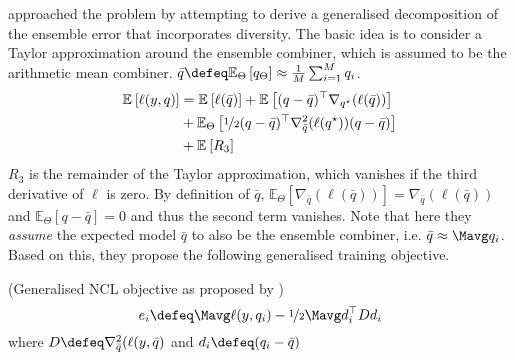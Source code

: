 \documentclass[../main.tex]{subfiles}
\begin{document}
\citeauthor{buschjager_GeneralizedNegativeCorrelation_2020} \cite{buschjager_GeneralizedNegativeCorrelation_2020} approached the problem by attempting to derive a generalised decomposition of the ensemble error that incorporates diversity. The basic idea is to consider a Taylor approximation around the ensemble combiner, which is assumed to be the arithmetic mean combiner. $\bar{q} \defeq \mathbb{E}_{\Theta}\left[ q_{\Theta} \right] \approx \frac{1}{M}\sum_{i=1}^M q_i$.
\begin{align*}
\mathbb{E}_{}\left[ \ell(y, q) \right]  &= 
\mathbb{E}_{}\left[ \ell(\bar{q}) \right] 
+ \mathbb{E}_{}\left[ (q - \bar{q})^\top \nabla_{q^\star}(\ell (\bar{q})) \right]  \\
&+ \mathbb{E}_{\Theta}\left[ \nicefrac{1}{2} (q-\bar{q})^\top\nabla^2_{\bar{q}}(\ell(q^\star))(q-\bar{q}) \right] \\
&+ \mathbb{E}_{}\left[ R_{3} \right] 
\end{align*}
$R_{3}$ is the remainder of the Taylor approximation, which vanishes if the third derivative of $\ell$ is zero.
By definition of $\bar{q}$, $\mathbb{E}_{\Theta}\left[ \nabla_{\bar{q}}(\ell(\bar{q})) \right] = \nabla_{\bar{q}}(\ell(\bar{q}))$ and $\mathbb{E}_{\Theta}\left[ q-\bar{q} \right] = 0$ and thus the second term vanishes.
Note that here they \textit{assume} the expected model $\bar{q}$ to also be the ensemble combiner, i.e. $\bar{q} \approx \Mavg q_{i}$. 
Based on this, they propose the following generalised training objective.
\begin{definition} (Generalised NCL objective as proposed by \cite{buschjager_GeneralizedNegativeCorrelation_2020})
    \label{def:buschj-ncl-objective}
$$
e_i \defeq \Mavg \ell(y,q_{i}) - \nicefrac{1}{2} \Mavg d_{i}^\top D d_{i}
$$
where $D \defeq \nabla^2_{\bar{q}}(\ell(y, \bar{q})$ and $d_{i} \defeq (q_{i} - \bar{q})$
\end{definition}
\end{document}
